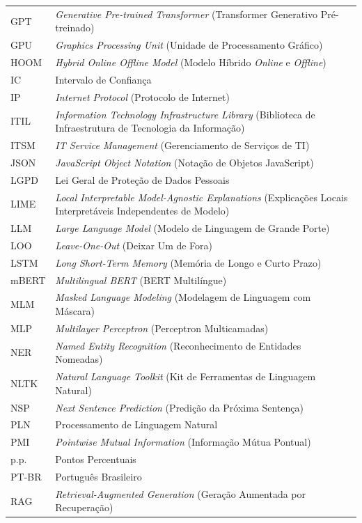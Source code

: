 \documentclass[
    12pt,                %
    openright,           %
    oneside,             %
    a4paper,             %
    english,             %
    brazil               %
]{abntex2}
\begin{document}
\begin{longtable}{@{}p{3.8cm}p{}@{}}
GPT & \textit{Generative Pre-trained Transformer} (Transformer Generativo Pré-treinado) \\
GPU & \textit{Graphics Processing Unit} (Unidade de Processamento Gráfico) \\
HOOM & \textit{Hybrid Online Offline Model} (Modelo Híbrido \textit{Online} e \textit{Offline}) \\
IC & Intervalo de Confiança \\
IP & \textit{Internet Protocol} (Protocolo de Internet) \\
ITIL & \textit{Information Technology Infrastructure Library} (Biblioteca de Infraestrutura de Tecnologia da Informação) \\
ITSM & \textit{IT Service Management} (Gerenciamento de Serviços de TI) \\
JSON & \textit{JavaScript Object Notation} (Notação de Objetos JavaScript) \\
LGPD & Lei Geral de Proteção de Dados Pessoais \\
LIME & \textit{Local Interpretable Model-Agnostic Explanations} (Explicações Locais Interpretáveis Independentes de Modelo) \\
LLM & \textit{Large Language Model} (Modelo de Linguagem de Grande Porte) \\
LOO & \textit{Leave-One-Out} (Deixar Um de Fora) \\
LSTM & \textit{Long Short-Term Memory} (Memória de Longo e Curto Prazo) \\
mBERT & \textit{Multilingual BERT} (BERT Multilíngue) \\
MLM & \textit{Masked Language Modeling} (Modelagem de Linguagem com Máscara) \\
MLP & \textit{Multilayer Perceptron} (Perceptron Multicamadas) \\
NER & \textit{Named Entity Recognition} (Reconhecimento de Entidades Nomeadas) \\
NLTK & \textit{Natural Language Toolkit} (Kit de Ferramentas de Linguagem Natural) \\
NSP & \textit{Next Sentence Prediction} (Predição da Próxima Sentença) \\
PLN & Processamento de Linguagem Natural \\
PMI & \textit{Pointwise Mutual Information} (Informação Mútua Pontual) \\
p.p. & Pontos Percentuais \\
PT-BR & Português Brasileiro \\
RAG & \textit{Retrieval-Augmented Generation} (Geração Aumentada por Recuperação) \\

\end{longtable}
\end{document}

